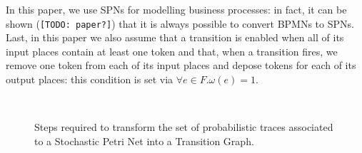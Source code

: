 In this paper, we use SPNs for modelling business processes: in fact, it can be shown (\texttt{[TODO: paper?]}) that it is always possible to convert BPMNs to SPNs. Last, in this paper we also assume that a transition is enabled when all of its input places contain at least one token and that, when a transition fires, we remove one token from each of its input places and depose tokens for each of its output places: this condition is set via $\forall e\in F. \omega(e)=1$.
\begin{figure}[!ph]
	\centering
	\qquad
	\\
	\caption{Steps required to transform the set of probabilistic traces associated to a Stochastic Petri Net into a Transition Graph.}
	\label{transformspn}
\end{figure}


